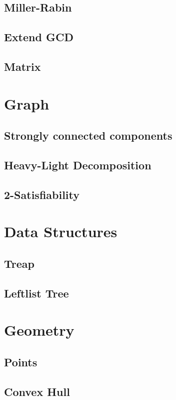 \documentclass[a4paper,10pt,twocolumn,oneside]{article}
\begin{document}
\subsection{Miller-Rabin}

\subsection{Extend GCD}

\subsection{Matrix}

\section{Graph}
\subsection{Strongly connected components}

\subsection{Heavy-Light Decomposition}

\subsection{2-Satisfiability}

\section{Data Structures}
\subsection{Treap}

\subsection{Leftlist Tree}

\section{Geometry}
\subsection{Points}

\subsection{Convex Hull}

\end{document}
